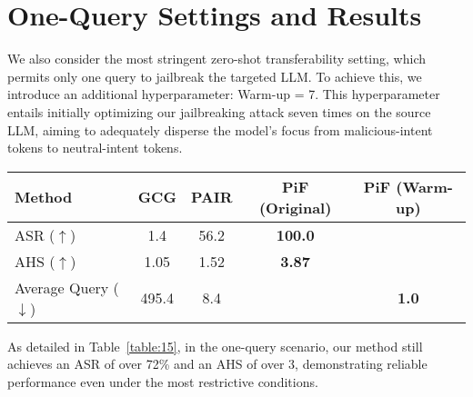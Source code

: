 \section{One-Query Settings and Results}
\label{appendix:G}

We also consider the most stringent zero-shot transferability setting, which permits only one query to jailbreak the targeted LLM. 
To achieve this, we introduce an additional hyperparameter: Warm-up = 7. 
This hyperparameter entails initially optimizing our jailbreaking attack seven times on the source LLM, aiming to adequately disperse the model’s focus from malicious-intent tokens to neutral-intent tokens.

\begin{table*}[h]
\setlength{\tabcolsep}{15pt} %
\caption{{Compare the results of jailbreaking attacks targeting Llama-2-13B-Chat on Advbench.}} 
\label{table:15}
\centering
  \begin{tabular}{l | c | c | c | c}
    \toprule
    \toprule
    {Method} & {GCG} & {PAIR} & {PiF} (Original) & {PiF (Warm-up)} \\
    \midrule
    {ASR ($\uparrow$)} & {1.4} & {56.2} & \cellcolor{SelfColor!15}\textbf{{100.0}} & \cellcolor{SelfColor!15}{72.69} \\
    {AHS ($\uparrow$)} & {1.05} & {1.52} & \cellcolor{SelfColor!15}\textbf{{3.87}} & \cellcolor{SelfColor!15}{3.05} \\
    {Average Query ($\downarrow$)} & {495.4} & {8.4} & \cellcolor{SelfColor!15}{2.9} & \cellcolor{SelfColor!15}\textbf{{1.0}} \\ 
    \bottomrule
    \bottomrule
  \end{tabular}
\end{table*}

As detailed in Table~\ref{table:15}, in the one-query scenario, our method still achieves an ASR of over 72\% and an AHS of over 3, demonstrating reliable performance even under the most restrictive conditions.